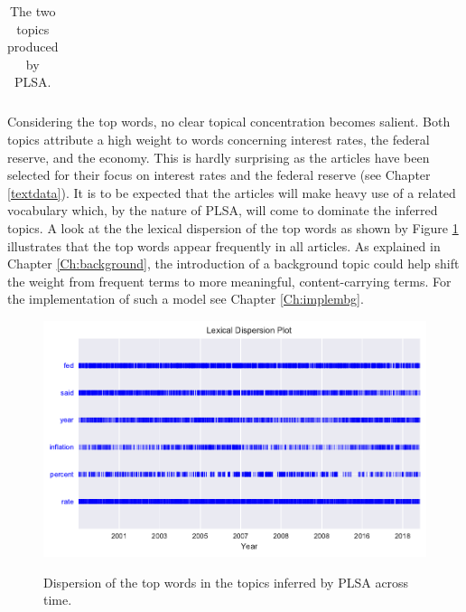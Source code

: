 \documentclass[11pt,a4paper,english,oneside]{book}
\numberwithin{equation}{chapter}
\begin{document}
\begin{table}[h]
\begin{tabular}{ p{3cm}  p{2cm}  p{3cm}  p{2cm} }
		\bottomrule %
	\end{tabular}
	\caption{The two topics produced by PLSA.} %
	\label{tab:topic1} %
\end{table}

Considering the top words, no clear topical concentration becomes salient. Both topics attribute a high weight to words concerning interest rates, the federal reserve, and the economy. This is hardly surprising as the articles have been selected for their focus on interest rates and the federal reserve (see Chapter \ref{textdata}). It is to be expected that the articles will make heavy use of a related vocabulary which, by the nature of PLSA, will come to dominate the inferred topics. A look at the the lexical dispersion of the top words as shown by Figure \ref{dispersionPLSAorig} illustrates that the top words appear frequently in all articles. As explained in Chapter \ref{Ch:background}, the introduction of a background topic could help shift the weight from frequent terms to more meaningful, content-carrying terms. For the implementation of such a model see Chapter \ref{Ch:implembg}.


\begin{figure}
	\caption{Dispersion of the top words in the topics inferred by PLSA across time.}
	\centering
	\includegraphics[scale=1]{Images/dispersionplot_topicPLSAorig.pdf}
	\label{dispersionPLSAorig}
\end{figure}
\end{document}
